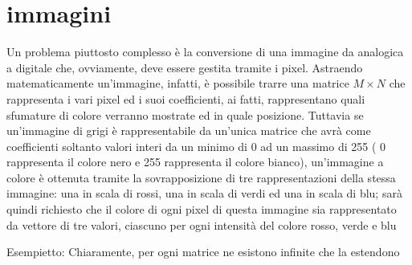 \chapter{immagini}
Un problema piuttosto complesso è la conversione di una immagine da analogica a digitale che, ovviamente, deve essere gestita tramite i pixel. Astraendo matematicamente un'immagine, infatti, è possibile trarre una matrice $M\times N$ che rappresenta i vari pixel ed i suoi coefficienti, ai fatti, rappresentano quali sfumature di colore verranno mostrate ed in quale posizione. Tuttavia se un'immagine di grigi è rappresentabile da un'unica matrice che avrà come coefficienti soltanto valori interi da un minimo di 0 ad un massimo di
255 ( 0 rappresenta il colore nero e 255 rappresenta il colore bianco), un'immagine a colore è ottenuta tramite la sovrapposizione di tre rappresentazioni della stessa immagine: una in scala di rossi, una in scala di verdi ed una in scala di blu; sarà quindi richiesto che il colore di ogni pixel di questa immagine sia rappresentato da vettore di tre valori, ciascuno per ogni intensità del colore rosso, verde e blu


Esempietto:
Chiaramente, per ogni matrice ne esistono infinite che la estendono

